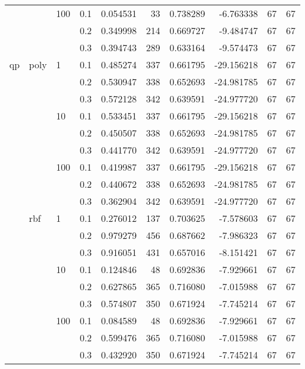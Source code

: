 \begin{table}[h!]
\begin{tabular}{llllrrrrrr}
   &     & 100 & 0.1 &  0.054531 &      33 &  0.738289 &  -6.763338 &          67 &        67 \\
   &     &     & 0.2 &  0.349998 &     214 &  0.669727 &  -9.484747 &          67 &        67 \\
   &     &     & 0.3 &  0.394743 &     289 &  0.633164 &  -9.574473 &          67 &        67 \\
qp & poly & 1   & 0.1 &  0.485274 &     337 &  0.661795 & -29.156218 &          67 &        67 \\
   &     &     & 0.2 &  0.530947 &     338 &  0.652693 & -24.981785 &          67 &        67 \\
   &     &     & 0.3 &  0.572128 &     342 &  0.639591 & -24.977720 &          67 &        67 \\
   &     & 10  & 0.1 &  0.533451 &     337 &  0.661795 & -29.156218 &          67 &        67 \\
   &     &     & 0.2 &  0.450507 &     338 &  0.652693 & -24.981785 &          67 &        67 \\
   &     &     & 0.3 &  0.441770 &     342 &  0.639591 & -24.977720 &          67 &        67 \\
   &     & 100 & 0.1 &  0.419987 &     337 &  0.661795 & -29.156218 &          67 &        67 \\
   &     &     & 0.2 &  0.440672 &     338 &  0.652693 & -24.981785 &          67 &        67 \\
   &     &     & 0.3 &  0.362904 &     342 &  0.639591 & -24.977720 &          67 &        67 \\
   & rbf & 1   & 0.1 &  0.276012 &     137 &  0.703625 &  -7.578603 &          67 &        67 \\
   &     &     & 0.2 &  0.979279 &     456 &  0.687662 &  -7.986323 &          67 &        67 \\
   &     &     & 0.3 &  0.916051 &     431 &  0.657016 &  -8.151421 &          67 &        67 \\
   &     & 10  & 0.1 &  0.124846 &      48 &  0.692836 &  -7.929661 &          67 &        67 \\
   &     &     & 0.2 &  0.627865 &     365 &  0.716080 &  -7.015988 &          67 &        67 \\
   &     &     & 0.3 &  0.574807 &     350 &  0.671924 &  -7.745214 &          67 &        67 \\
   &     & 100 & 0.1 &  0.084589 &      48 &  0.692836 &  -7.929661 &          67 &        67 \\
   &     &     & 0.2 &  0.599476 &     365 &  0.716080 &  -7.015988 &          67 &        67 \\
   &     &     & 0.3 &  0.432920 &     350 &  0.671924 &  -7.745214 &          67 &        67 \\
\bottomrule
\end{tabular}
\end{table}
